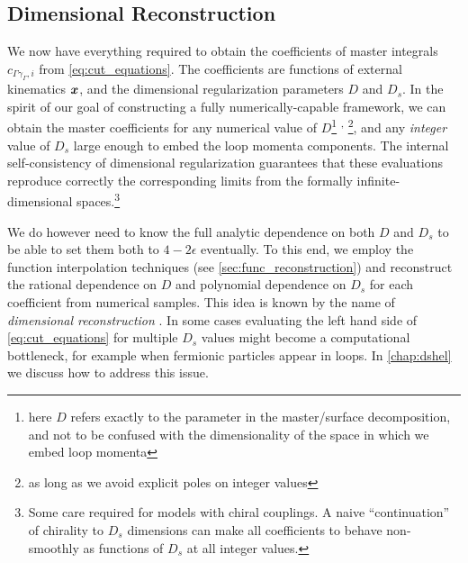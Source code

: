 \subsection{Dimensional Reconstruction}
\label{sec:dimensional_reconstruction}

We now have everything required to obtain the coefficients of master integrals 
$c_{\Gamma\gamma_\Gamma,i}$ from  \cref{eq:cut_equations}.  
The coefficients are functions of external kinematics $\vb*{x}$, and the dimensional regularization parameters $D$ and $D_s$.
In the spirit of our goal of constructing a fully numerically-capable framework, 
we can obtain the master coefficients
for any numerical value of $D$\footnote{
  here $D$ refers exactly to the parameter in the master/surface decomposition,
  and  not to be confused with the dimensionality of the space in which we embed loop momenta
}%
\textsuperscript{,}%
\footnote{as long as we avoid explicit poles on integer values},
and any  \emph{integer} value of $D_s$ large enough to embed the loop momenta components.
The internal self-consistency of dimensional regularization guarantees
that these evaluations reproduce correctly the corresponding limits from the formally infinite-dimensional spaces.\footnote{
  Some care required for models with chiral couplings. A naive ``continuation'' of chirality to $D_s$ dimensions
  can make all coefficients to behave non-smoothly as functions of $D_s$ at all integer values.
}

We do however need to know the full analytic dependence on both $D$ and $D_s$ to be able
to set them both to $4-2\epsilon$ eventually.
To this end, we employ the function interpolation techniques (see \cref{sec:func_reconstruction})
and reconstruct the rational dependence on $D$ and polynomial dependence on $D_s$ for each coefficient from numerical samples.
This idea is known by the name of
\emph{dimensional reconstruction} \cite{Giele:2008ve,Ellis:2008ir,Boughezal:2011br,Abreu:2017xsl,Abreu:2017hqn}.
In some cases evaluating the left hand side of \cref{eq:cut_equations} for multiple $D_s$ values might become a computational bottleneck,
for example when fermionic particles appear in loops. In \cref{chap:dshel} we discuss how to address this issue.


